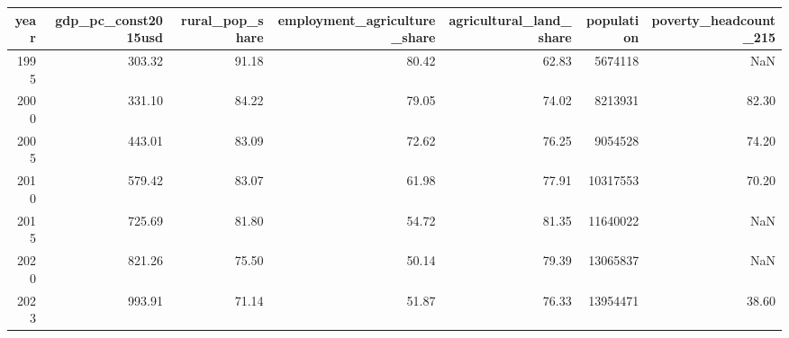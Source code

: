 \begin{tabular}{rrrrrrr}
\toprule
year & gdp\_pc\_const2015usd & rural\_pop\_share & employment\_agriculture\_share & agricultural\_land\_share & population & poverty\_headcount\_215 \\
\midrule
1995 & 303.32 & 91.18 & 80.42 & 62.83 & 5674118 & NaN \\
2000 & 331.10 & 84.22 & 79.05 & 74.02 & 8213931 & 82.30 \\
2005 & 443.01 & 83.09 & 72.62 & 76.25 & 9054528 & 74.20 \\
2010 & 579.42 & 83.07 & 61.98 & 77.91 & 10317553 & 70.20 \\
2015 & 725.69 & 81.80 & 54.72 & 81.35 & 11640022 & NaN \\
2020 & 821.26 & 75.50 & 50.14 & 79.39 & 13065837 & NaN \\
2023 & 993.91 & 71.14 & 51.87 & 76.33 & 13954471 & 38.60 \\
\bottomrule
\end{tabular}
